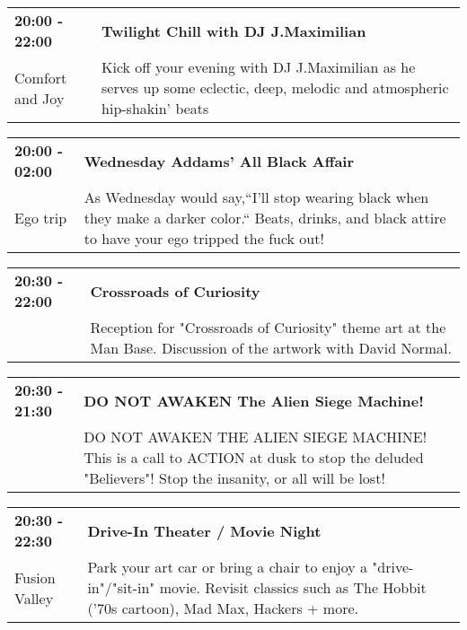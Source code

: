 \begin{tabular}{ p{1in} p{2.2in} }
    \textbf{20:00 - 22:00} & \textbf{Twilight Chill with DJ J.Maximilian} \\
    Comfort and Joy \newline  & Kick off your evening with DJ J.Maximilian  as he serves up some eclectic, deep, melodic and atmospheric hip-shakin' beats \\
    \hline 
\end{tabular}
    
\begin{tabular}{ p{1in} p{2.2in} }
    \textbf{20:00 - 02:00} & \textbf{Wednesday Addams' All Black Affair  } \\
    Ego trip \newline  & As Wednesday would say,``I'll stop wearing black when they make a darker color.`` Beats, drinks, and black attire to have your ego tripped the fuck out! \\
    \hline 
\end{tabular}
    
\begin{tabular}{ p{1in} p{2.2in} }
    \textbf{20:30 - 22:00} & \textbf{Crossroads of Curiosity} \\
    ~ \newline  & Reception for "Crossroads of Curiosity" theme art at the Man Base.  Discussion of the artwork with David Normal. \\
    \hline 
\end{tabular}
    
\begin{tabular}{ p{1in} p{2.2in} }
    \textbf{20:30 - 21:30} & \textbf{DO NOT AWAKEN The Alien Siege Machine!} \\
    ~ \newline  & DO NOT AWAKEN THE ALIEN SIEGE MACHINE! This is a call to ACTION at dusk to stop the deluded "Believers"! Stop the insanity, or all will be lost! \\
    \hline 
\end{tabular}
    
\begin{tabular}{ p{1in} p{2.2in} }
    \textbf{20:30 - 22:30} & \textbf{Drive-In Theater / Movie Night} \\
    Fusion Valley \newline  & Park your art car or bring a chair to enjoy a "drive-in"/"sit-in" movie. Revisit classics such as The Hobbit ('70s cartoon), Mad Max, Hackers + more. \\
    \hline 
\end{tabular}
    
